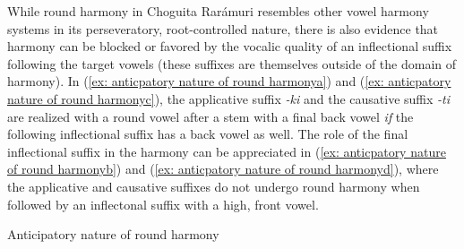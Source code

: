 While round harmony in Choguita Rarámuri resembles other vowel harmony systems in its perseveratory, root-controlled nature, there is also evidence that harmony can be blocked or favored by the vocalic quality of an inflectional suffix following the target vowels (these suffixes are themselves outside of the domain of harmony). In (\ref{ex: anticpatory nature of round harmonya}) and (\ref{ex: anticpatory nature of round harmonyc}), the applicative suffix \textit{-ki} and the causative suffix \textit{-ti} are realized with a round vowel after a stem with a final back vowel \textit{if} the following inflectional suffix has a back vowel as well. The role of the final inflectional suffix in the harmony can be appreciated in (\ref{ex: anticpatory nature of round harmonyb}) and (\ref{ex: anticpatory nature of round harmonyd}), where the applicative and causative suffixes do not undergo round harmony when followed by an inflectonal suffix with a high, front vowel.

\ea\label{ex: anticpatory nature of round harmony}
{Anticipatory nature of round harmony}

    \label{ex: anticpatory nature of round harmonya}
        \label{ex: anticpatory nature of round harmonyb}
            \label{ex: anticpatory nature of round harmonyc}
                \label{ex: anticpatory nature of round harmonyd}
    \z
\z

